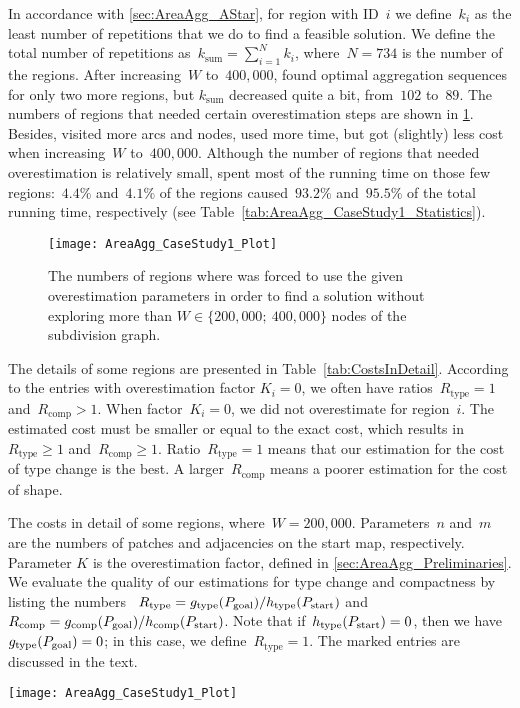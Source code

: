 \documentclass[acmsmall,natbib=false]{acmart}
\begin{document}
In accordance with \sect\ref{sec:AreaAgg_AStar}, 
for region with ID~$i$ 
we define~$k_i$ as the least number of repetitions 
that we do to find a feasible solution. 
We define the total number of repetitions 
as~$k_\mathrm{sum}=\sum_{i=1}^N k_i$, 
where~$N=734$ is the number of the regions.
After increasing~$W$ to~$400{,}000$, 
\Astar found optimal aggregation sequences 
for only two more regions, 
but $k_\mathrm{sum}$ decreased quite a bit, 
from~$102$ to~$89$. 
The numbers of regions that needed certain
overestimation steps are shown in 
\fig\ref{fig:AreaAgg_OverStats}. 
Besides, \Astar visited more arcs and nodes, 
used more time, 
but got (slightly) less cost when increasing~$W$ to~$400{,}000$.
Although the number of regions 
that needed overestimation is relatively small, 
\Astar spent most of the running time 
on those few regions:~$4.4\%$ and~$4.1\%$ of the regions 
caused~$93.2\%$ and~$95.5\%$ of the total running time, 
respectively 
(see Table~\ref{tab:AreaAgg_CaseStudy1_Statistics}).

\begin{figure}[tb]
\centering
\texttt{[image: AreaAgg\_CaseStudy1\_Plot]}
\caption{The numbers of regions where \Astar was 
	forced to use the given overestimation parameters
	in order to find a solution 
	without exploring more than 
	$W \in \{200{,}000;~400{,}000\}$ 
	nodes of the subdivision graph.}
\label{fig:AreaAgg_OverStats}
\end{figure}

The details of some regions are presented in 
Table~\ref{tab:CostsInDetail}.
According to the entries with overestimation factor $K_i=0$, 
we often have 
ratios~$R_\mathrm{type}=1$ and~$R_\mathrm{comp}>1$.
When factor~$K_i=0$, we did not overestimate for region~$i$.
The estimated cost must be smaller or equal to the exact cost,
which results in~$R_\mathrm{type}\ge 1$ 
and~$R_\mathrm{comp}\ge 1$.
Ratio~$R_\mathrm{type} = 1$ means that our estimation for the 
cost of type change is the best.
A larger~$R_\mathrm{comp}$ means 
a poorer estimation for the cost of shape.

\begin{table*}[tb]
\caption{The costs in detail of some regions, 
	where~$W=200{,}000$.  
	Parameters~$n$ and~$m$ are the numbers of patches and 
	adjacencies on the start map, respectively.
	Parameter $K$ is the overestimation factor, 
	defined in \sect\ref{sec:AreaAgg_Preliminaries}. 
	We evaluate the quality 
	of our estimations for type change and 
	compactness by listing the numbers~
	$R_\mathrm{type}=g_\mathrm{type}(P_\mathrm{goal})
	/h_\mathrm{type}(P_\mathrm{start})$ and~
	$R_\mathrm{comp}=g_\mathrm{comp}(P_\mathrm{goal})
	/h_\mathrm{comp}(P_\mathrm{start})$. 
	Note that if~$h_\mathrm{type}(P_\mathrm{start})=0$,
    then we have~$g_\mathrm{type}(P_\mathrm{goal})=0$; 
	in this case, we define~$R_\mathrm{type}=1$.
	The marked entries are discussed in the text.
}
\label{tab:CostsInDetail}
\centering
\texttt{[image: AreaAgg\_CaseStudy1\_Plot]}
\end{table*}
\end{document}
